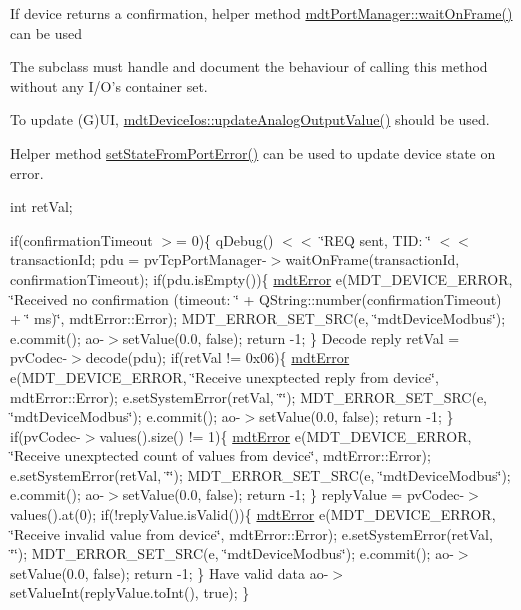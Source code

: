 \begin{DoxyItemize}
\item If device returns a confirmation, helper method \hyperlink{classmdt_port_manager_a1db6b8da9ff16221c917a1a75366e5c0}{mdtPortManager::waitOnFrame()} can be used
\item The subclass must handle and document the behaviour of calling this method without any I/O's container set.
\item To update (G)UI, \hyperlink{classmdt_device_ios_aaa6fbf435ddf8760487d962e1a6307f2}{mdtDeviceIos::updateAnalogOutputValue()} should be used.
\item Helper method \hyperlink{classmdt_device_ab77eb4c1bb50201e97a4dbd8b538659a}{setStateFromPortError()} can be used to update device state on error. 
\end{DoxyItemize}

int retVal;

if(confirmationTimeout $>$= 0)\{ qDebug() $<$$<$ \char`\"{}REQ sent, TID: \char`\"{} $<$$<$ transactionId; pdu = pvTcpPortManager-\/$>$waitOnFrame(transactionId, confirmationTimeout); if(pdu.isEmpty())\{ \hyperlink{classmdt_error}{mdtError} e(MDT\_\-DEVICE\_\-ERROR, \char`\"{}Received no confirmation (timeout: \char`\"{} + QString::number(confirmationTimeout) + \char`\"{} ms)\char`\"{}, mdtError::Error); MDT\_\-ERROR\_\-SET\_\-SRC(e, \char`\"{}mdtDeviceModbus\char`\"{}); e.commit(); ao-\/$>$setValue(0.0, false); return -\/1; \} Decode reply retVal = pvCodec-\/$>$decode(pdu); if(retVal != 0x06)\{ \hyperlink{classmdt_error}{mdtError} e(MDT\_\-DEVICE\_\-ERROR, \char`\"{}Receive unexptected reply from device\char`\"{}, mdtError::Error); e.setSystemError(retVal, \char`\"{}\char`\"{}); MDT\_\-ERROR\_\-SET\_\-SRC(e, \char`\"{}mdtDeviceModbus\char`\"{}); e.commit(); ao-\/$>$setValue(0.0, false); return -\/1; \} if(pvCodec-\/$>$values().size() != 1)\{ \hyperlink{classmdt_error}{mdtError} e(MDT\_\-DEVICE\_\-ERROR, \char`\"{}Receive unexptected count of values from device\char`\"{}, mdtError::Error); e.setSystemError(retVal, \char`\"{}\char`\"{}); MDT\_\-ERROR\_\-SET\_\-SRC(e, \char`\"{}mdtDeviceModbus\char`\"{}); e.commit(); ao-\/$>$setValue(0.0, false); return -\/1; \} replyValue = pvCodec-\/$>$values().at(0); if(!replyValue.isValid())\{ \hyperlink{classmdt_error}{mdtError} e(MDT\_\-DEVICE\_\-ERROR, \char`\"{}Receive invalid value from device\char`\"{}, mdtError::Error); e.setSystemError(retVal, \char`\"{}\char`\"{}); MDT\_\-ERROR\_\-SET\_\-SRC(e, \char`\"{}mdtDeviceModbus\char`\"{}); e.commit(); ao-\/$>$setValue(0.0, false); return -\/1; \} Have valid data ao-\/$>$setValueInt(replyValue.toInt(), true); \}



